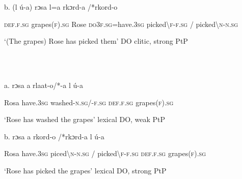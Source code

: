 \documentclass[output=paper]{langscibook}
\begin{document}
\begin{styleTabellaLUNGA}
  b.  (l     ú-a)       rɔsa    l=a         rkɔrd-a    /*rkord-o 
\end{styleTabellaLUNGA}

\begin{styleTabellaLUNGA}
    \textsc{def.f.sg}  grapes(\textsc{f}).\textsc{sg}   Rose   \textsc{do3f.sg}=have.3\textsc{sg}   picked{\textbackslash}\textsc{f}{}-\textsc{f.sg}  / picked{\textbackslash}\textsc{n-n.sg}
\end{styleTabellaLUNGA}

\begin{styleTabellaLUNGA}
    ‘(The grapes) Rose has picked them’           DO clitic, strong PtP
\end{styleTabellaLUNGA}

\begin{styleTabellaLUNGA}
\ea%
    \label{ex:key:24}
    \gll \\
         \\
    \glt
    \z %

          a.  rɔsa   a     rlaat-o/*-a       l       ú-a
\end{styleTabellaLUNGA}

\begin{styleTabellaLUNGA}
    Rosa   have.3\textsc{sg}   washed-\textsc{n.sg}/-\textsc{f.sg}  \textsc{def.f.sg}   grapes(\textsc{f}).\textsc{sg}
\end{styleTabellaLUNGA}

\begin{styleTabellaLUNGA}
    ‘Rose has washed the grapes’               lexical DO, weak PtP
\end{styleTabellaLUNGA}

\begin{styleTabellaLUNGA}
  b.  rɔsa   a     rkord-o    /*rkɔrd-a      l     ú-a  
\end{styleTabellaLUNGA}

\begin{styleTabellaLUNGA}
    Rosa  have.3\textsc{sg}   piced{\textbackslash}\textsc{n-n.sg}  \textsc{/} picked{\textbackslash}\textsc{f}{}-\textsc{f.sg}    \textsc{def.f.sg}   grapes(\textsc{f}).\textsc{sg}
\end{styleTabellaLUNGA}

\begin{styleTabellaLUNGA}
    ‘Rose has picked the grapes’               lexical DO, strong PtP
\end{styleTabellaLUNGA}
\end{document}
